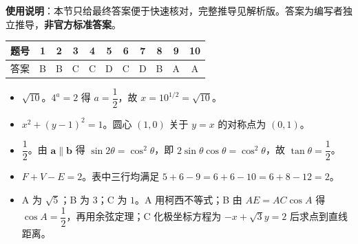 
\begin{gknotice}
\textbf{使用说明}：本节只给最终答案便于快速核对，完整推导见解析版。答案为编写者独立推导，\textbf{非官方标准答案}。
\end{gknotice}

\begin{center}\begin{tabular}{ccccccccccc}
\toprule
题号 & 1 & 2 & 3 & 4 & 5 & 6 & 7 & 8 & 9 & 10 \\
\midrule
答案 & B & B & C & C & D & C & D & B & A & A \\
\bottomrule
\end{tabular}\end{center}

\begin{itemize}[leftmargin=2.6em]
  \item[\textbf{11.}] $\sqrt{10}$。$4^a=2$ 得 $a=\dfrac12$，故 $x=10^{1/2}=\sqrt{10}$。
  \item[\textbf{12.}] $x^2+(y-1)^2=1$。圆心 $(1,0)$ 关于 $y=x$ 的对称点为 $(0,1)$。
  \item[\textbf{13.}] $\dfrac12$。由 $\boldsymbol a\parallel\boldsymbol b$ 得 $\sin2\theta=\cos^2\theta$，即 $2\sin\theta\cos\theta=\cos^2\theta$，故 $\tan\theta=\dfrac12$。
  \item[\textbf{14.}] $F+V-E=2$。表中三行均满足 $5+6-9=6+6-10=6+8-12=2$。
  \item[\textbf{15.}] A 为 $\sqrt5$；B 为 $3$；C 为 $1$。A 用柯西不等式；B 由 $AE=AC\cos A$ 得 $\cos A=\dfrac12$，再用余弦定理；C 化极坐标方程为 $-x+\sqrt3y=2$ 后求点到直线距离。
\end{itemize}

